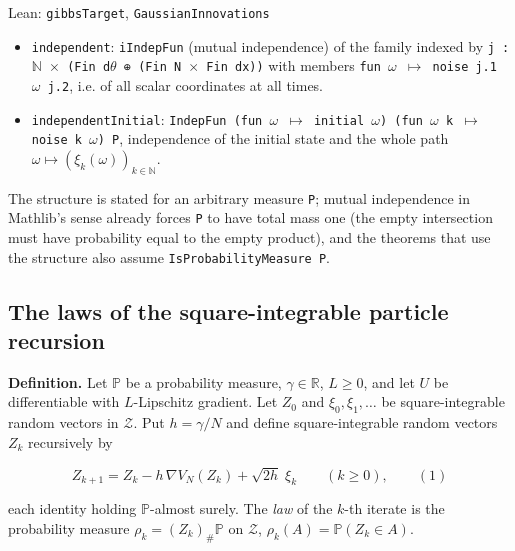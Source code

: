 \documentclass[11pt,a4paper]{report}
\begin{document}
\begin{leanbox}{Lean: \texttt{gibbsTarget}, \texttt{GaussianInnovations}}
\begin{enumerate}
\begin{itemize}
\item \texttt{independent}: \texttt{i\allowbreak{}Indep\allowbreak{}Fun} (mutual independence) of the family indexed by \texttt{j : \ensuremath{\mathbb N} \ensuremath{\times} (Fin d\ensuremath{\theta} ⊕ (Fin N \ensuremath{\times} Fin dx))} with members \texttt{fun \ensuremath{\omega} \ensuremath{\mapsto} noise j.\allowbreak{}1 \ensuremath{\omega} j.\allowbreak{}2}, i.e. of all scalar coordinates at all times.

\item \texttt{independent\allowbreak{}Initial}: \texttt{Indep\allowbreak{}Fun (fun \ensuremath{\omega} \ensuremath{\mapsto} initial \ensuremath{\omega}) (fun \ensuremath{\omega} k \ensuremath{\mapsto} noise k \ensuremath{\omega}) P}, independence of the initial state and the whole path \(\omega\mapsto(\xi_k(\omega))_{k\in\mathbb N}\).

\end{itemize}

The structure is stated for an arbitrary measure \texttt{P}; mutual independence in Mathlib's sense already forces \texttt{P} to have total mass one (the empty intersection must have probability equal to the empty product), and the theorems that use the structure also assume \texttt{Is\allowbreak{}Probability\allowbreak{}Measure P}.

\end{enumerate}
\end{leanbox}
\subsection{\texorpdfstring{The laws of the square-integrable particle recursion}{The laws of the square-integrable particle recursion}}
\label{report-step-IPLA-Model-lean-3}


\textbf{Definition.} Let \(\mathbb P\) be a probability measure, \(\gamma\in\mathbb R\), \(L\ge0\), and let \(U\) be differentiable with \(L\)-Lipschitz gradient. Let \(Z_0\) and \(\xi_0,\xi_1,\dots\) be square-integrable random vectors in \(\mathcal Z\). Put \(h=\gamma/N\) and define square-integrable random vectors \(Z_k\) recursively by


\[Z_{k+1}=Z_k-h\,\nabla V_N(Z_k)+\sqrt{2h}\;\xi_k\qquad(k\ge0),\qquad(1)\]


each identity holding \(\mathbb P\)-almost surely. The \emph{law} of the \(k\)-th iterate is the probability measure \(\rho_k=(Z_k)_\#\mathbb P\) on \(\mathcal Z\), \(\rho_k(A)=\mathbb P(Z_k\in A)\).
\end{document}
